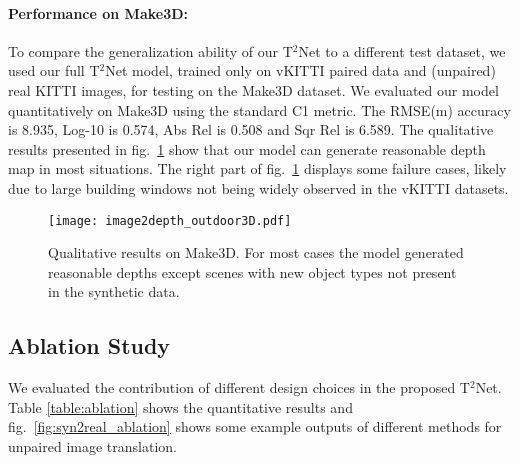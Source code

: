 \documentclass[runningheads]{llncs}
\begin{document}
\paragraph{\bf Performance on Make3D:} To compare the generalization ability of our T$^2$Net to a different test dataset, we used our full T$^2$Net model, trained only on vKITTI paired data and (unpaired) real KITTI images, for testing on the Make3D dataset\cite{saxena2009make3d}. We evaluated our model quantitatively on Make3D using the standard C1 metric. The RMSE(m) accuracy is 8.935, Log-10 is 0.574, Abs Rel is  0.508 and Sqr Rel is 6.589. The qualitative results presented in fig.~\ref{fig:depth_outdoor3D} show that our model can generate reasonable depth map in most situations. The right part of fig.~\ref{fig:depth_outdoor3D} displays some failure cases, likely due to large building windows not being widely observed in the vKITTI datasets.

\begin{figure}[tb!]
	\centering
	\texttt{[image: image2depth\_outdoor3D.pdf]}
	\caption{Qualitative results on Make3D. For most cases the model generated reasonable depths except scenes with new object types not present in the synthetic data. }
	\label{fig:depth_outdoor3D}
\end{figure}

\subsection{Ablation Study}

We evaluated the contribution of different design choices in the proposed T$^2$Net. Table \ref{table:ablation} shows the quantitative results and fig.~\ref{fig:syn2real_ablation} shows some example outputs of different methods for unpaired image translation.
\end{document}
